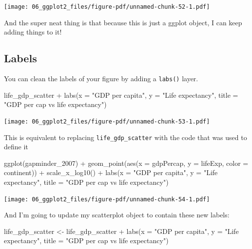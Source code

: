 \documentclass[
  letterpaper,
  DIV=11,
  numbers=noendperiod]{scrreprt}
\newenvironment{Shaded}{\begin{snugshade}}{\end{snugshade}}
\newcommand{\AttributeTok}[1]{\textcolor[rgb]{0.40,0.45,0.13}{#1}}
\newcommand{\FunctionTok}[1]{\textcolor[rgb]{0.28,0.35,0.67}{#1}}
\newcommand{\NormalTok}[1]{\textcolor[rgb]{0.00,0.23,0.31}{#1}}
\newcommand{\OtherTok}[1]{\textcolor[rgb]{0.00,0.23,0.31}{#1}}
\newcommand{\SpecialCharTok}[1]{\textcolor[rgb]{0.37,0.37,0.37}{#1}}
\newcommand{\StringTok}[1]{\textcolor[rgb]{0.13,0.47,0.30}{#1}}
\begin{document}
\texttt{[image: 06\_ggplot2\_files/figure-pdf/unnamed-chunk-52-1.pdf]}

And the super neat thing is that because this is just a ggplot object, I
can keep adding things to it!

\subsection{Labels}\label{labels}

You can clean the labels of your figure by adding a \texttt{labs()}
layer.

\begin{Shaded}
\begin{Highlighting}[]
\NormalTok{life\_gdp\_scatter }\SpecialCharTok{+} 
  \FunctionTok{labs}\NormalTok{(}\AttributeTok{x =} \StringTok{"GDP per capita"}\NormalTok{, }
       \AttributeTok{y =} \StringTok{"Life expectancy"}\NormalTok{, }
       \AttributeTok{title =} \StringTok{"GDP per cap vs life expectancy"}\NormalTok{)}
\end{Highlighting}
\end{Shaded}

\texttt{[image: 06\_ggplot2\_files/figure-pdf/unnamed-chunk-53-1.pdf]}

This is equivalent to replacing \texttt{life\_gdp\_scatter} with the
code that was used to define it

\begin{Shaded}
\begin{Highlighting}[]
\FunctionTok{ggplot}\NormalTok{(gapminder\_2007) }\SpecialCharTok{+} 
  \FunctionTok{geom\_point}\NormalTok{(}\FunctionTok{aes}\NormalTok{(}\AttributeTok{x =}\NormalTok{ gdpPercap, }
                 \AttributeTok{y =}\NormalTok{ lifeExp, }
                 \AttributeTok{color =}\NormalTok{ continent)) }\SpecialCharTok{+} 
  \FunctionTok{scale\_x\_log10}\NormalTok{() }\SpecialCharTok{+}
  \FunctionTok{labs}\NormalTok{(}\AttributeTok{x =} \StringTok{"GDP per capita"}\NormalTok{, }
       \AttributeTok{y =} \StringTok{"Life expectancy"}\NormalTok{, }
       \AttributeTok{title =} \StringTok{"GDP per cap vs life expectancy"}\NormalTok{)}
\end{Highlighting}
\end{Shaded}

\texttt{[image: 06\_ggplot2\_files/figure-pdf/unnamed-chunk-54-1.pdf]}

And I'm going to update my scatterplot object to contain these new
labels:

\begin{Shaded}
\begin{Highlighting}[]
\NormalTok{life\_gdp\_scatter }\OtherTok{\textless{}{-}}\NormalTok{ life\_gdp\_scatter }\SpecialCharTok{+} 
  \FunctionTok{labs}\NormalTok{(}\AttributeTok{x =} \StringTok{"GDP per capita"}\NormalTok{, }
       \AttributeTok{y =} \StringTok{"Life expectancy"}\NormalTok{, }
       \AttributeTok{title =} \StringTok{"GDP per cap vs life expectancy"}\NormalTok{)}
\end{Highlighting}
\end{Shaded}
\end{document}
